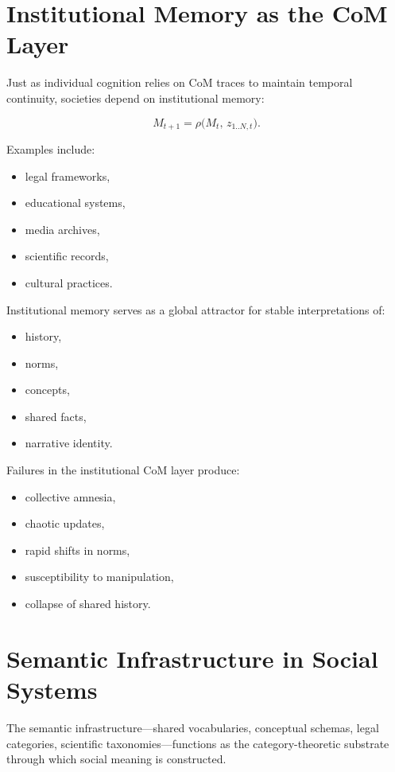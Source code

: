 \documentclass[12pt,oneside]{book}
\theoremstyle{plain}
\theoremstyle{definition}
\begin{document}
\section{Institutional Memory as the CoM Layer}

Just as individual cognition relies on CoM traces to maintain temporal continuity,  
societies depend on institutional memory:

\[
M_{t+1} = \rho\bigl(M_t,\, z_{1..N,t}\bigr).
\]

Examples include:

\begin{itemize}
    \item legal frameworks,
    \item educational systems,
    \item media archives,
    \item scientific records,
    \item cultural practices.
\end{itemize}

Institutional memory serves as a global attractor for stable interpretations of:

\begin{itemize}
    \item history,
    \item norms,
    \item concepts,
    \item shared facts,
    \item narrative identity.
\end{itemize}

Failures in the institutional CoM layer produce:

\begin{itemize}
    \item collective amnesia,
    \item chaotic updates,
    \item rapid shifts in norms,
    \item susceptibility to manipulation,
    \item collapse of shared history.
\end{itemize}

\section{Semantic Infrastructure in Social Systems}

The semantic infrastructure—shared vocabularies, conceptual schemas, legal 
categories, scientific taxonomies—functions as the category-theoretic substrate 
through which social meaning is constructed.
\end{document}
